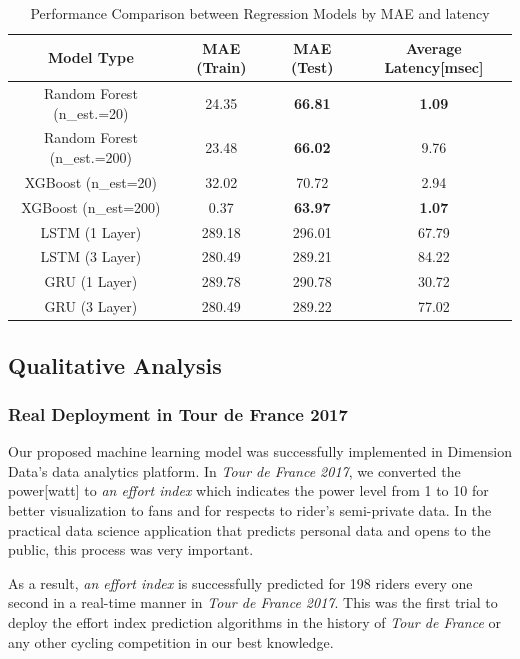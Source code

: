 \documentclass[runningheads]{llncs}
\begin{document}
\begin{table}[t]
 \begin{center}
  \caption{Performance Comparison between Regression Models by MAE and latency}
  \label{tab1:MAE_latency_result}
  \begin{tabular}{|c|c|c|c|}
   \hline
   Model Type & MAE (Train) & MAE (Test) & Average Latency[msec]\\
   \hline
   Random Forest (n\_est.=20) & 24.35 & {\bf{66.81}} & {\bf{1.09}}\\
   Random Forest (n\_est.=200) & 23.48 & {\bf{66.02}} & 9.76\\
   XGBoost (n\_est=20) & 32.02 & 70.72 & 2.94\\
   XGBoost (n\_est=200) & 0.37 & {\bf{63.97}} & {\bf{1.07}}\\
   LSTM (1 Layer) & 289.18 & 296.01 & 67.79\\
   LSTM (3 Layer) & 280.49 & 289.21 & 84.22\\
   GRU (1 Layer) & 289.78 & 290.78 & 30.72\\
   GRU (3 Layer) & 280.49 & 289.22 & 77.02\\
   \hline
  \end{tabular}
 \end{center}
 \end{table}

\subsection{Qualitative Analysis}

\subsubsection{Real Deployment in Tour de France 2017}
Our proposed machine learning model was successfully implemented in Dimension Data's data analytics platform. In {\it{Tour de France 2017}}, we converted the power[watt] to {\it{an effort index}} which indicates the power level from 1 to 10 for better visualization to fans and for respects to rider's semi-private data. In the practical data science application that predicts personal data and opens to the public, this process was very important.

As a result, {\it{an effort index}} is successfully predicted for 198 riders every one second in a real-time manner in {\it{Tour de France 2017}}. This was the first trial to deploy the effort index prediction algorithms in the history of {\it{Tour de France}} or any other cycling competition in our best knowledge.
\end{document}
